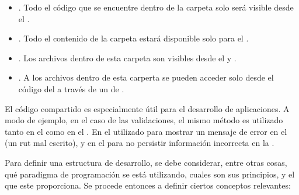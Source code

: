 	\begin{itemize}
		\item
			\textbf{\clientFolder}. Todo el código que se encuentre dentro de la carpeta \clientFolder solo será visible desde el \clientSideAS.
		\item
			\textbf{\serverFolder}. Todo el contenido de la carpeta \serverFolder estará disponible solo para el \serverSideAS.
		\item
			\textbf{\publicFolder}. Los archivos dentro de esta carpeta son visibles desde el \clientSideAS y \serverSideAS.
		\item
			\textbf{\privateFolder}. A los archivos dentro de esta carperta se pueden acceder solo desde el código del \serverAS a través de un \apiAS de \assetsAS.
	\end{itemize}



El código compartido es especialmente útil para el desarrollo de aplicaciones. A modo de ejemplo, en el caso de las validaciones, el mismo método es utilizado tanto en el \clientSideAS como en el \serverSideAS. En el \clientSideAS utilizado para mostrar un mensaje de error en el \browserINT (un rut mal escrito), y en el \serverSideAS para no persistir información incorrecta en la \dataBasesDB.

Para definir una estructura de desarrollo, se debe considerar, entre otras cosas, qué paradigma de programación se está utilizando, cuales son sus principios, y el \apiAS que este proporciona. Se procede entonces a definir ciertos conceptos relevantes:


